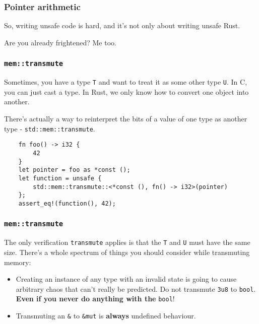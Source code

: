 \documentclass[aspectratio=1610,t]{beamer}
\begin{document}

\begin{frame}[fragile]
\frametitle{Pointer arithmetic}
So, writing unsafe code is hard, and it's not only about writing unsafe Rust.

Are you already frightened? Me too.
\end{frame}


\begin{frame}[fragile]
\frametitle{\texttt{mem::transmute}}
Sometimes, you have a type \texttt{T} and want to treat it as some other type \texttt{U}. In C, you can just cast a type. In Rust, we only know how to convert one object into another.

There's actually a way to reinterpret the bits of a value of one type as another type - \texttt{std::mem::transmute}.

\begin{verbatim}
    fn foo() -> i32 {
        42
    }
    let pointer = foo as *const ();
    let function = unsafe {
        std::mem::transmute::<*const (), fn() -> i32>(pointer)
    };
    assert_eq!(function(), 42);
\end{verbatim}
\end{frame}


\begin{frame}[fragile]
\frametitle{\texttt{mem::transmute}}
The only verification \texttt{transmute} applies is that the \texttt{T} and \texttt{U} must have the same size. There's a whole spectrum of things you should consider while transmuting memory:

\begin{itemize}
    \item<1-> Creating an instance of any type with an invalid state is going to cause arbitrary chaos that can't really be predicted. Do not transmute \texttt{3u8} to \texttt{bool}. \textbf{Even if you never do anything with the} \texttt{bool}!
    \item<2-> Transmuting an \texttt{\&} to \texttt{\&mut} is \textbf{always} undefined behaviour.
\end{itemize}

\end{frame}
\end{document}
